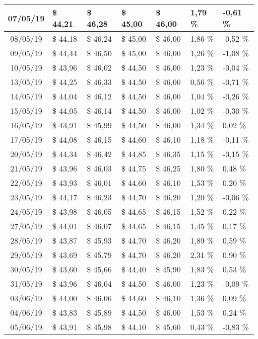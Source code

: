 \begin{center}
\begin{longtable}{|c|p{1.5cm}|p{1.5cm}|p{1.5cm}|p{1.5cm}|p{1.5cm}|p{1.5cm}|}
07/05/19 & \$ 44,21 & \$ 46,28 & \$ 45,00 & \$ 46,00 & 1,79 \% & -0,61 \% \\ \hline
08/05/19 & \$ 44,18 & \$ 46,24 & \$ 45,00 & \$ 46,00 & 1,86 \% & -0,52 \% \\ \hline
09/05/19 & \$ 44,44 & \$ 46,50 & \$ 45,00 & \$ 46,00 & 1,26 \% & -1,08 \% \\ \hline
10/05/19 & \$ 43,96 & \$ 46,02 & \$ 44,50 & \$ 46,00 & 1,23 \% & -0,04 \% \\ \hline
13/05/19 & \$ 44,25 & \$ 46,33 & \$ 44,50 & \$ 46,00 & 0,56 \% & -0,71 \% \\ \hline
14/05/19 & \$ 44,04 & \$ 46,12 & \$ 44,50 & \$ 46,00 & 1,04 \% & -0,26 \% \\ \hline
15/05/19 & \$ 44,05 & \$ 46,14 & \$ 44,50 & \$ 46,00 & 1,02 \% & -0,30 \% \\ \hline
16/05/19 & \$ 43,91 & \$ 45,99 & \$ 44,50 & \$ 46,00 & 1,34 \% & 0,02 \% \\ \hline
17/05/19 & \$ 44,08 & \$ 46,15 & \$ 44,60 & \$ 46,10 & 1,18 \% & -0,11 \% \\ \hline
20/05/19 & \$ 44,34 & \$ 46,42 & \$ 44,85 & \$ 46,35 & 1,15 \% & -0,15 \% \\ \hline
21/05/19 & \$ 43,96 & \$ 46,03 & \$ 44,75 & \$ 46,25 & 1,80 \% & 0,48 \% \\ \hline
22/05/19 & \$ 43,93 & \$ 46,01 & \$ 44,60 & \$ 46,10 & 1,53 \% & 0,20 \% \\ \hline
23/05/19 & \$ 44,17 & \$ 46,23 & \$ 44,70 & \$ 46,20 & 1,20 \% & -0,06 \% \\ \hline
24/05/19 & \$ 43,98 & \$ 46,05 & \$ 44,65 & \$ 46,15 & 1,52 \% & 0,22 \% \\ \hline
27/05/19 & \$ 44,01 & \$ 46,07 & \$ 44,65 & \$ 46,15 & 1,45 \% & 0,17 \% \\ \hline
28/05/19 & \$ 43,87 & \$ 45,93 & \$ 44,70 & \$ 46,20 & 1,89 \% & 0,59 \% \\ \hline
29/05/19 & \$ 43,69 & \$ 45,79 & \$ 44,70 & \$ 46,20 & 2,31 \% & 0,90 \% \\ \hline
30/05/19 & \$ 43,60 & \$ 45,66 & \$ 44,40 & \$ 45,90 & 1,83 \% & 0,53 \% \\ \hline
31/05/19 & \$ 43,96 & \$ 46,04 & \$ 44,50 & \$ 46,00 & 1,23 \% & -0,09 \% \\ \hline
03/06/19 & \$ 44,00 & \$ 46,06 & \$ 44,60 & \$ 46,10 & 1,36 \% & 0,09 \% \\ \hline
04/06/19 & \$ 43,83 & \$ 45,89 & \$ 44,50 & \$ 46,00 & 1,53 \% & 0,24 \% \\ \hline
05/06/19 & \$ 43,91 & \$ 45,98 & \$ 44,10 & \$ 45,60 & 0,43 \% & -0,83 \% \\ \hline

\end{longtable}
\end{center}
